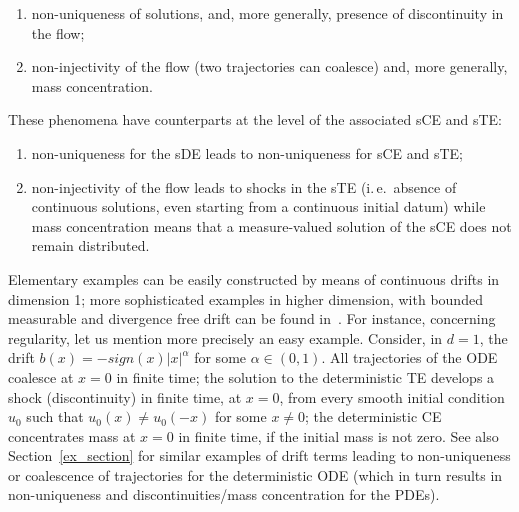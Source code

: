 \documentclass[a4paper,10pt]{article}
\begin{document}
\begin{enumerate}
  \item[1)] non-uniqueness of solutions, and, more generally, 
  presence of discontinuity in the flow;
  \item[2)] non-injectivity of the flow (two trajectories can coalesce) and,
  more generally, mass concentration.
\end{enumerate}
These phenomena have counterparts at the level of the associated sCE and sTE:
\begin{enumerate}
  \item[1)]  non-uniqueness for the sDE leads to non-uniqueness for sCE and sTE;
  \item[2)]  non-injectivity of the flow leads to shocks in the sTE (i.\,e.\
absence of continuous solutions, even starting from a continuous initial
datum) while mass concentration means that a measure-valued
solution of the sCE does not remain distributed.
\end{enumerate}
Elementary examples can be easily constructed by means of continuous drifts 
in dimension 1; more sophisticated
examples in higher dimension, with bounded measurable and divergence free
drift can be found in~\cite{AIZENMAN78}. For instance, concerning
regularity, let us mention more precisely an easy example. Consider, in $d=1$, 
the drift $b( x) =-sign(x) \vert x \vert^{\alpha }$ for some $\alpha \in ( 0,1) $. 
All trajectories of the ODE coalesce at $x=0$ in finite time; the solution to the 
deterministic TE develops a shock (discontinuity) in finite time, at $x=0$, from every
smooth initial condition $u_{0}$ such that $u_{0}( x) \neq
u_{0}( -x) $ for some $x\neq 0$; the deterministic CE
concentrates mass at $x=0$ in finite time, if the initial mass is not zero. See also Section~\ref{ex_section} for similar examples of drift terms leading to non-uniqueness or coalescence of trajectories for the deterministic ODE (which in turn results in non-uniqueness and discontinuities/mass concentration for the PDEs).
\end{document}
